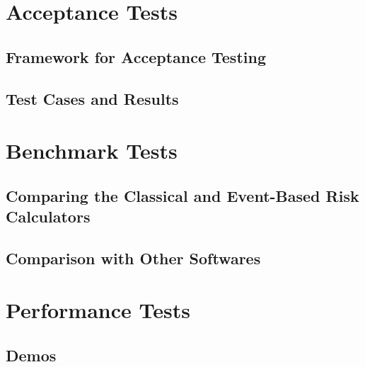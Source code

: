 \documentclass[11pt,fleqn]{book} %
\begin{document}
\thispagestyle{empty}
\part{Acceptance Tests}

\chapter{Framework for Acceptance Testing}
   \label{chap:acc-framework}
   
   \cleardoublepage
\chapter{Test Cases and Results}
   \label{chap:acc-tests}
   
   \cleardoublepage

\thispagestyle{empty}
\part{Benchmark Tests}

\chapter{Comparing the Classical and Event-Based Risk Calculators}
   \label{chap:bm-classical-eventbased}
   
   \cleardoublepage

\chapter{Comparison with Other Softwares}
   \label{chap:bm-comparison}
   
   \cleardoublepage

\thispagestyle{empty}
\part{Performance Tests}

\chapter{Demos}
   \label{chap:perf-demos}
   
   \cleardoublepage
\end{document}
